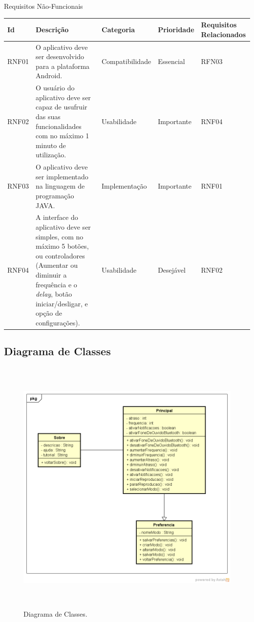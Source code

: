 \begin{quadro}[!htb]
	\caption{Requisitos N\~ao-Funcionais}\label{quad:reqnaofuncionais}
	\centering
	\begin{tabular}{|p{1.0cm}|p{5.0cm}|p{2.5cm}|p{2.0cm}|p{2.5cm}|}
		\hline
		\textbf{Id} & \textbf{Descri\c{c}\~ao}& \textbf{Categoria} & \textbf{Prioridade} & \textbf{Requisitos Relacionados}\\
		\hline
		RNF01 & O aplicativo deve ser desenvolvido para a plataforma Android. & Compatibilidade & Essencial & RFN03\\
		\hline
		RNF02 & O usu\'ario do aplicativo deve ser capaz de usufruir das suas funcionalidades com no m\'aximo 1 minuto de utiliza\c{c}\~ao. & Usabilidade & Importante & RNF04 \\
		\hline
		RNF03 & O aplicativo deve ser implementado na linguagem de programa\c{c}\~ao JAVA. & Implementa\c{c}\~ao  & Importante & RNF01\\
		\hline
		RNF04 & A interface do aplicativo deve ser simples, com no m\'aximo 5 bot\~oes, ou controladores (Aumentar ou diminuir a frequ\^encia e o \textit{delay}, bot\~ao iniciar/desligar, e op\c{c}\~ao de configura\c{c}\~oes). & Usabilidade & Desej\'avel & RNF02\\
		\hline
	\end{tabular}
\end{quadro}

\subsection{Diagrama de Classes}

\begin{figure}[!htb]
	\centering
	\caption[DC01]{Diagrama de Classes. \label{fig:diagramadeclasses}}
	\includegraphics[height=13cm]{./Figuras/class_diagram.png}%
\end{figure}

